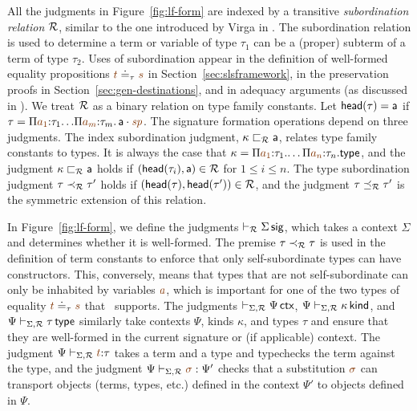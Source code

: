 All the judgments in Figure~\ref{fig:lf-form} are indexed by a
transitive {\it subordination relation} $\mathcal R$, similar to the one
introduced by Virga in \cite{virga99higherorder}. The subordination
relation is used to determine a term or variable of type $\tau_1$ can
be a (proper) subterm of a term of type $\tau_2$. Uses of
subordination appear in the definition of well-formed equality
propositions $\lf t \doteq_\tau \lf s$ in
Section~\ref{sec:slsframework}, in the preservation proofs in
Section~\ref{sec:gen-destinations}, and in adequacy arguments (as
discussed in \cite{harper07mechanizing}). We treat $\mathcal R$ as a
binary relation on type family constants.  Let ${\sf head}(\tau) =
{\sf a}$ if $\tau =
\lfpi{a_1}{\tau_{1}}{\,.\,.\lfpi{a_{m}}{\tau_{m}}{\,\lfroot{\sf
      a}{\spi}}}$. The signature formation operations depend on three
judgments. The index subordination judgment, $\kappa \sqsubset_\mathcal R
{\sf a}$, relates type family constants to types.
%
It is always the case that $\kappa =
\lfpi{a_1}{\tau_1}{\ldots\lfpi{a_n}{\tau_n}{\sf type}}$, and the
judgment $\kappa \sqsubset_\mathcal R {\sf a}$ holds if $({\sf
  head}(\tau_i), {\sf a}) \in \mathcal R$ for $1 \leq i \leq n$.
%
The type subordination judgment $\tau \prec_\mathcal R \tau'$ holds if
$({\sf head}(\tau), {\sf head}(\tau')) \in \mathcal R$, and the judgment
$\tau \preceq_\mathcal R \tau'$ is the symmetric extension of this
relation.

In Figure~\ref{fig:lf-form}, we define the judgments $\vdash_\mathcal R
\Sigma\,{\sf sig}$, which takes a context $\Sigma$ and determines
whether it is well-formed.  The premise $\tau \prec_\mathcal R \tau$ is
used in the definition of term constants to enforce that only
self-subordinate types can have constructors. This, conversely, means
that types that are not self-subordinate can only be inhabited by
variables $\lf{a}$, which is important for one of the two types of
equality $\lf{t} \doteq_\tau \lf{s}$ that \sls~supports. The judgments
$\vdash_{\Sigma,\mathcal R} \Psi\,{\sf ctx}$, $\Psi
\vdash_{\Sigma,\mathcal R} \kappa\,{\sf kind}$, and $\Psi
\vdash_{\Sigma,\mathcal R} \tau\,{\sf type}$ similarly take contexts
$\Psi$, kinds $\kappa$, and types $\tau$ and ensure that they are
well-formed in the current signature or (if applicable) context.  The
judgment $\Psi \vdash_{\Sigma,\subord} \lf{t}{:} \tau$ takes a term
and a type and typechecks the term against the type, and the judgment
$\Psi \vdash_{\Sigma,\subord} \lf{\sigma} : \Psi'$ checks that a
substitution $\lf{\sigma}$ can transport objects (terms, types, etc.)
defined in the context $\Psi'$ to objects defined in $\Psi$.

